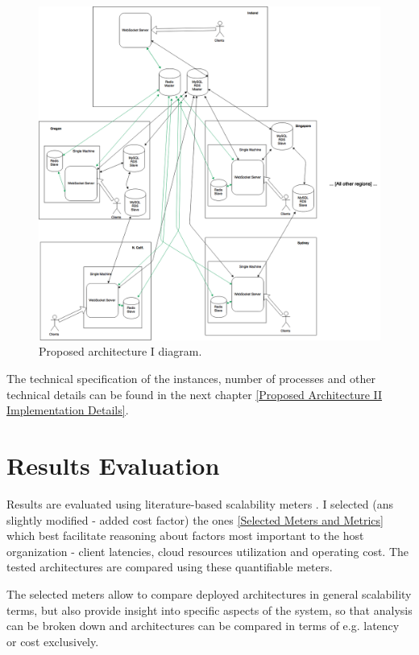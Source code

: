\documentclass{uvamscse}
\begin{document}
\begin{figure}[H]
\centering
\includegraphics[scale=0.3]{archprop2}
\caption{Proposed architecture I diagram.}
\label{figure:archprop2}
\end{figure}

The technical specification of the instances, number of processes and other technical details can be found in the next chapter \ref{Proposed Architecture II Implementation Details}.

\section{Results Evaluation}
Results are evaluated using literature-based scalability meters \cite{Models}. I selected (ans slightly modified - added cost factor) the ones \ref{Selected Meters and Metrics} which best facilitate reasoning about factors most important to the host organization - client latencies, cloud resources utilization and operating cost. The tested architectures are compared using these quantifiable meters.

The selected meters allow to compare deployed architectures in general scalability terms, but also provide insight into specific aspects of the system, so that analysis can be broken down and architectures can be compared in terms of e.g. latency or cost exclusively.
\end{document}
